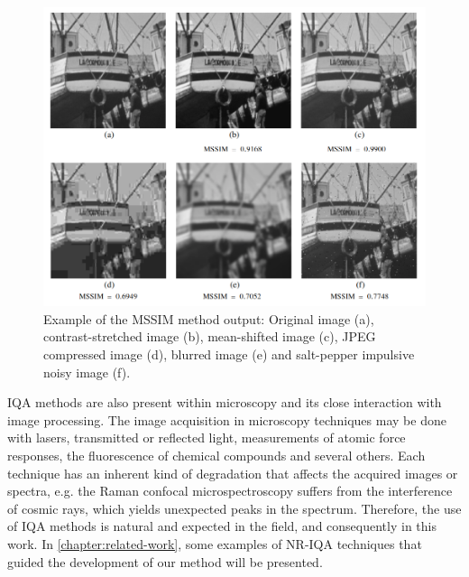 \begin{figure}[H]
	\centering
	\caption{\label{fig:mssim_IQA_exampe} Example of the MSSIM method output: Original image (a), contrast-stretched image (b), mean-shifted image (c), JPEG compressed image (d), blurred image (e) and salt-pepper impulsive noisy image (f).}
	\begin{center}
    \includegraphics[scale=0.45]{images/mssim_IQA.png}
	\end{center}
	\centering
\end{figure}

IQA methods are also present within microscopy and its close interaction with image processing. The image acquisition in microscopy techniques may be done with lasers, transmitted or reflected light, measurements of atomic force responses, the fluorescence of chemical compounds and several others. Each technique has an inherent kind of degradation that affects the acquired images or spectra, e.g. the Raman confocal microspectroscopy suffers from the interference of cosmic rays, which yields unexpected peaks in the spectrum. Therefore, the use of IQA methods is natural and expected in the field, and consequently in this work. In \autoref{chapter:related-work}, some examples of NR-IQA techniques that guided the development of our method will be presented.